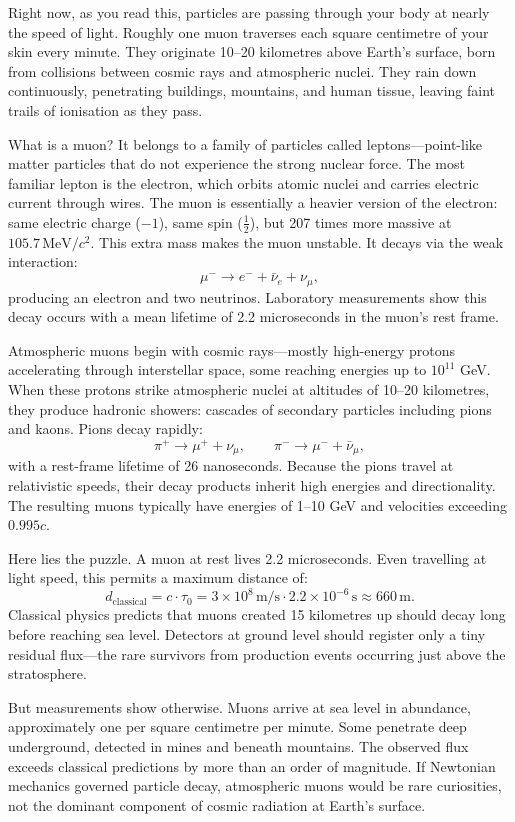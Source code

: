 Right now, as you read this, particles are passing through your body at nearly the speed of light. Roughly one muon traverses each square centimetre of your skin every minute. They originate 10–20 kilometres above Earth's surface, born from collisions between cosmic rays and atmospheric nuclei. They rain down continuously, penetrating buildings, mountains, and human tissue, leaving faint trails of ionisation as they pass.

What is a muon? It belongs to a family of particles called leptons—point-like matter particles that do not experience the strong nuclear force. The most familiar lepton is the electron, which orbits atomic nuclei and carries electric current through wires. The muon is essentially a heavier version of the electron: same electric charge ($-1$), same spin ($\tfrac{1}{2}$), but 207 times more massive at $105.7\,\text{MeV}/c^2$. This extra mass makes the muon unstable. It decays via the weak interaction:
\[
\mu^- \rightarrow e^- + \bar{\nu}_e + \nu_\mu,
\]
producing an electron and two neutrinos. Laboratory measurements show this decay occurs with a mean lifetime of 2.2 microseconds in the muon's rest frame.

Atmospheric muons begin with cosmic rays—mostly high-energy protons accelerating through interstellar space, some reaching energies up to $10^{11}$ GeV. When these protons strike atmospheric nuclei at altitudes of 10–20 kilometres, they produce hadronic showers: cascades of secondary particles including pions and kaons. Pions decay rapidly:
\[
\pi^+ \rightarrow \mu^+ + \nu_\mu, \qquad \pi^- \rightarrow \mu^- + \bar{\nu}_\mu,
\]
with a rest-frame lifetime of 26 nanoseconds. Because the pions travel at relativistic speeds, their decay products inherit high energies and directionality. The resulting muons typically have energies of 1–10 GeV and velocities exceeding $0.995c$.

Here lies the puzzle. A muon at rest lives 2.2 microseconds. Even travelling at light speed, this permits a maximum distance of:
\[
d_{\text{classical}} = c \cdot \tau_0 = 3 \times 10^8\,\text{m/s} \cdot 2.2 \times 10^{-6}\,\text{s} \approx 660\,\text{m}.
\]
Classical physics predicts that muons created 15 kilometres up should decay long before reaching sea level. Detectors at ground level should register only a tiny residual flux—the rare survivors from production events occurring just above the stratosphere.

But measurements show otherwise. Muons arrive at sea level in abundance, approximately one per square centimetre per minute. Some penetrate deep underground, detected in mines and beneath mountains. The observed flux exceeds classical predictions by more than an order of magnitude. If Newtonian mechanics governed particle decay, atmospheric muons would be rare curiosities, not the dominant component of cosmic radiation at Earth's surface.

